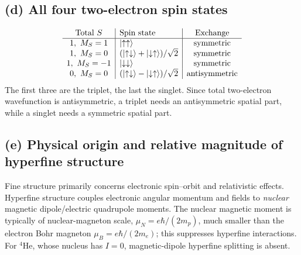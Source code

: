 \subsection*{(d) All four two-electron spin states}
\[
\begin{array}{c|l|c}
\text{Total }S&\text{Spin state}&\text{Exchange}\\\hline
1,\ M_S=1&\left\lvert \uparrow\uparrow\right\rangle&\text{symmetric}\\
1,\ M_S=0&
(\left\lvert \uparrow\downarrow\right\rangle+\left\lvert \downarrow\uparrow\right\rangle)/\sqrt2&
\text{symmetric}\\
1,\ M_S=-1&\left\lvert \downarrow\downarrow\right\rangle&\text{symmetric}\\
0,\ M_S=0&
(\left\lvert \uparrow\downarrow\right\rangle-\left\lvert \downarrow\uparrow\right\rangle)/\sqrt2&
\text{antisymmetric}
\end{array}
\]
The first three are the triplet, the last the singlet.
Since total two-electron wavefunction is antisymmetric,
a triplet needs an antisymmetric spatial part, while
a singlet needs a symmetric spatial part.

\subsection*{(e) Physical origin and relative magnitude of hyperfine structure}
Fine structure primarily concerns electronic
spin--orbit and relativistic effects. Hyperfine
structure couples electronic angular momentum and
fields to \emph{nuclear} magnetic dipole/electric
quadrupole moments. The nuclear magnetic moment
is typically of nuclear-magneton scale,
\(\mu_N=e\hbar/(2m_p)\), much smaller than the
electron Bohr magneton \(\mu_B=e\hbar/(2m_e)\);
this suppresses hyperfine interactions.
For \({}^4\mathrm{He}\), whose nucleus has \(I=0\),
magnetic-dipole hyperfine splitting is absent.


